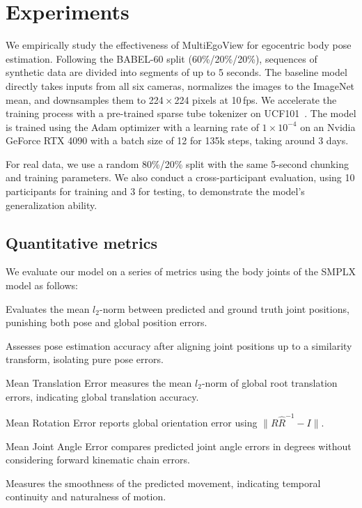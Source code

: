 

\section{Experiments}
\label{sec:experiments}
We empirically study the effectiveness of MultiEgoView for egocentric body pose estimation.
Following the BABEL-60 split \cite{punnakkalBABELBodiesAction2021jun} (60\%/20\%/20\%), sequences of synthetic data are divided into segments of up to 5 seconds.
The baseline model directly takes inputs from all six cameras, normalizes the images to the ImageNet mean, and downsamples them to 224\,$\times$\,224 pixels at 10\,fps.
We accelerate the training process with a pre-trained sparse tube tokenizer on UCF101~\cite{yrDanielcodeTubeViT2024may, soomroUCF101Dataset1012012dec}. 
The model is trained using the Adam optimizer with a learning rate of \(1 \times 10^{-4}\) on an Nvidia GeForce RTX 4090 with a batch size of 12 for 135k steps, taking around 3 days.

For real data, we use a random 80\%/20\% split with the same 5-second chunking and training parameters.
We also conduct a cross-participant evaluation, using 10 participants for training and 3 for testing, to demonstrate the model's generalization ability.

\subsection{Quantitative metrics}

We evaluate our model on a series of metrics using the body joints of the SMPLX model as follows:

\begin{description}[align=right,leftmargin=3.1cm,labelindent=2.9cm]
\item[Global MPJPE ($m$)] Evaluates the mean $l_{2}$-norm between predicted and ground truth joint positions, punishing both pose and global position errors.

\item[PA-MPJPE ($m$)] Assesses pose estimation accuracy after aligning joint positions up to a similarity transform, isolating pure pose errors.

\item[MTE ($m$)] Mean Translation Error measures the mean $l_{2}$-norm of global root translation errors, indicating global translation accuracy.
\item[MRE] Mean Rotation Error reports global orientation error using $\lVert R\hat{R}^{-1} - I \rVert$.

\item[MJAE (°)] Mean Joint Angle Error compares predicted joint angle errors in degrees without considering forward kinematic chain errors.

\item[Jerk ($m/s^3$)] Measures the smoothness of the predicted movement, indicating temporal continuity and naturalness of motion.
\end{description}

